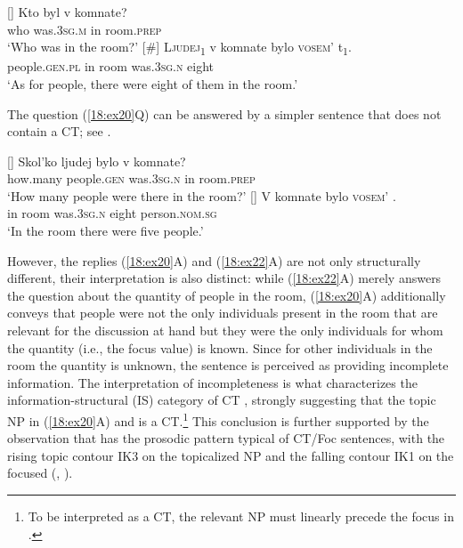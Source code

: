 \documentclass[output=paper,modfonts,newtxmath,hidelinks]{langscibook}
\begin{document}
\begin{exe}
\ex \label{18:ex21}
\begin{xlist}
[]{
	\gll 
    	 Kto byl v komnate?\\
         who was.\textsc{3sg.m} in room.\textsc{prep}\\
	\glt `Who was in the room?'
    }
[\#]{
	\gll \textsc{Ljudej\textsubscript{1}}  v   komnate  bylo     \textsc{vosem’}   t\textsubscript{1}.\\
		 people.\textsc{gen.pl} in   room    was.\textsc{3sg.n}  eight  \\
    	\glt `As for people, there were eight of them in the room.'
        }
\end{xlist}
\end{exe}

\noindent The question (\ref{18:ex20}Q) can be answered by a simpler sentence that does not contain a CT; see .

\begin{exe}
\ex \label{18:ex22}
\begin{xlist}
[]{
	\gll 
    	 Skol’ko ljudej bylo v komnate?\\
         how.many people.\textsc{gen} was.\textsc{3sg.n} in room.\textsc{prep}\\
	\glt `How many people were there in the room?'
    }
[]{
	\gll V  komnate  bylo    \textsc{vosem’}    .\\
		 in  room    was.\textsc{3sg.n}  eight     person.\textsc{nom.sg}\\
    \glt `In the room there were five people.'     
    }
\end{xlist}
\end{exe}


\noindent However, the replies (\ref{18:ex20}A) and (\ref{18:ex22}A) are not only structurally different, their interpretation is also distinct: while (\ref{18:ex22}A) merely answers the question about the quantity of people in the room, (\ref{18:ex20}A) additionally conveys that people were not the only individuals present in the room that are relevant for the discussion at hand but they were the only individuals for whom the quantity (i.e., the focus value) is known. Since for other individuals in the room the quantity is unknown, the sentence is perceived as providing incomplete information. The interpretation of incompleteness is what characterizes the information-structural (IS) category of CT \citep{Büring2003}, strongly suggesting that the topic NP in (\ref{18:ex20}A) and  is a CT.\footnote{\label{18:fn18}To be interpreted as a CT, the relevant NP must linearly precede the focus in  \citep{Titov2013}.} This conclusion is further supported by the observation that  has the prosodic pattern typical of CT/Foc sentences, with the rising topic contour IK3 on the topicalized NP and the falling contour IK1 on the focused  (\citealt{Bryzgunova1971, Bryzgunova1981}, \citealt{Titov2013}).
\end{document}
